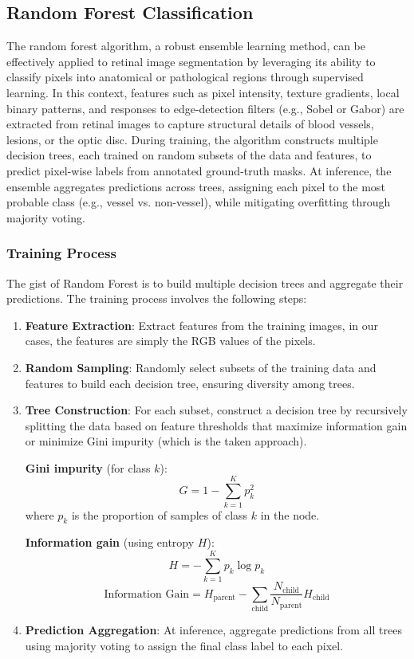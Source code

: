 \documentclass[final]{article}
\begin{document}
\subsection{Random Forest Classification}
The random forest algorithm, a robust ensemble learning method, can be effectively applied to retinal image segmentation by leveraging its ability to classify pixels into anatomical or pathological regions through supervised learning. In this context, features such as pixel intensity, texture gradients, local binary patterns, and responses to edge-detection filters (e.g., Sobel or Gabor) are extracted from retinal images to capture structural details of blood vessels, lesions, or the optic disc. During training, the algorithm constructs multiple decision trees, each trained on random subsets of the data and features, to predict pixel-wise labels from annotated ground-truth masks. At inference, the ensemble aggregates predictions across trees, assigning each pixel to the most probable class (e.g., vessel vs. non-vessel), while mitigating overfitting through majority voting. 

\subsubsection{Training Process}
The gist of Random Forest is to build multiple decision trees and aggregate their predictions. The training process involves the following steps:
\begin{enumerate}
    \item \textbf{Feature Extraction}: Extract features from the training images, in our cases, the features are simply the RGB values of the pixels.
    \item \textbf{Random Sampling}: Randomly select subsets of the training data and features to build each decision tree, ensuring diversity among trees.
    \item \textbf{Tree Construction}: For each subset, construct a decision tree by recursively splitting the data based on feature thresholds that maximize information gain or minimize Gini impurity (which is the taken approach).
    
\textbf{Gini impurity} (for class \( k \)):  
\[
G = 1 - \sum_{k=1}^K p_k^2
\]  
where \( p_k \) is the proportion of samples of class \( k \) in the node.  

\textbf{Information gain} (using entropy \( H \)):  
\[
H = -\sum_{k=1}^K p_k \log p_k
\]  
\[
\text{Information Gain} = H_{\text{parent}} - \sum_{\text{child}} \frac{N_{\text{child}}}{N_{\text{parent}}} H_{\text{child}}
\]  

    \item \textbf{Prediction Aggregation}: At inference, aggregate predictions from all trees using majority voting to assign the final class label to each pixel.
\end{enumerate}
\end{document}
